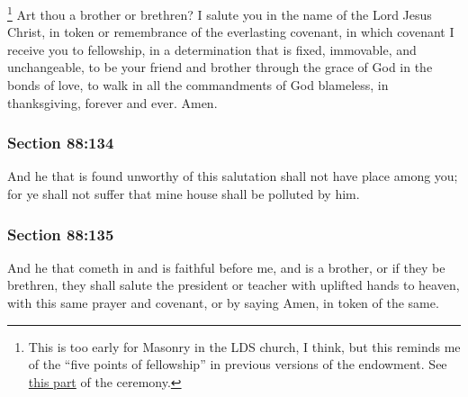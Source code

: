 			\footnote{%
				This is too early for Masonry in the LDS church, I think, but this reminds me of the ``five points of fellowship'' in previous versions of the endowment. See \hyperref[TEMPLE-ENDOWMENT-ENDOW-PRE-1990-VEIL]{this part} of the ceremony.
				}%
		Art thou a brother or brethren? I salute you in the name of the Lord Jesus Christ, in token or remembrance of the everlasting covenant, in which covenant I receive you to fellowship, in a determination that is fixed, immovable, and unchangeable, to be your friend and brother through the grace of God in the bonds of love, to walk in all the commandments of God blameless, in thanksgiving, forever and ever. Amen.


	\subsubsection{Section 88:134} %
		\label{DC88-134}

		And he that is found unworthy of this salutation shall not have place among you; for ye shall not suffer that mine house shall be polluted by him.


	\subsubsection{Section 88:135} %
		\label{DC88-135}

		And he that cometh in and is faithful before me, and is a brother, or if they be brethren, they shall salute the president or teacher with uplifted hands to heaven, with this same prayer and covenant, or by saying Amen, in token of the same.

